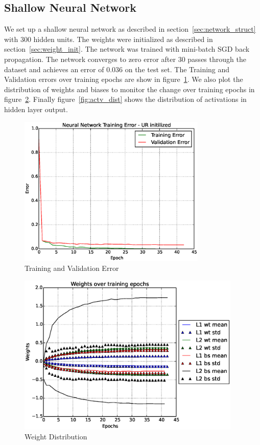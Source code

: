 \documentclass[Proceedings]{ascelike}
\begin{document}
\subsection{Shallow Neural Network} We set up a shallow neural network as
described in section~\ref{sec:network_struct} with $300$ hidden units. The
weights were initialized as described in section~\ref{sec:weight_init}. The
network was trained with mini-batch SGD back propagation. The network converges
to zero error after $30$ passes through the dataset and achieves an error of
$0.036$ on the test set. The Training and Validation errors over training
epochs are show in figure~\ref{fig:sn_test_err}. We also plot the distribution
of weights and biases to  monitor the change over training epochs in
figure~\ref{fig:wt_dist}. Finally figure~\ref{fig:actv_dist} shows the
distribution of activations in hidden layer output. 

\begin{figure}[H] \caption{Training and Validation Error}
\label{fig:sn_test_err} \centering \includegraphics[width=0.8\textwidth,
keepaspectratio]{shallownet_perf.eps} \end{figure}

\begin{figure}[H] \caption{Weight Distribution} \label{fig:wt_dist} \centering
\includegraphics[width=0.95\textwidth, keepaspectratio]{shallownet_weights.eps}
\end{figure}
\end{document}
